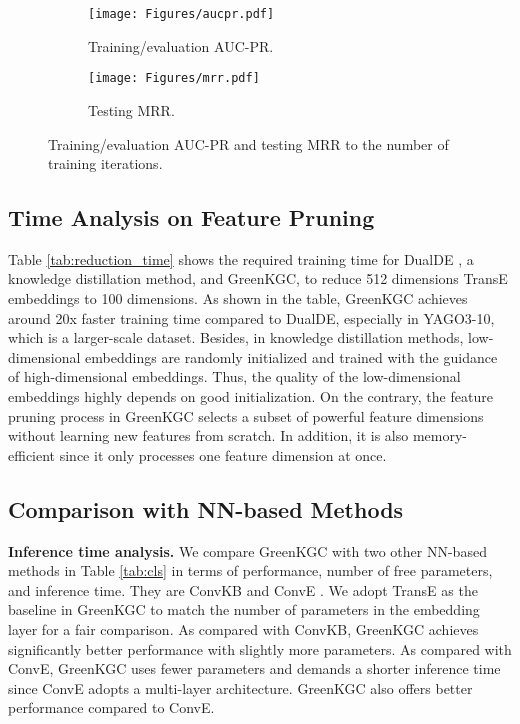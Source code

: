 \documentclass{article}
\begin{document}
\begin{figure}[t]
\centering
     \begin{subfigure}[b]{0.48\textwidth}
         \centering
         \texttt{[image: Figures/aucpr.pdf]}
         \caption{Training/evaluation AUC-PR.} \label{fig:aucpr}
     \end{subfigure}
\begin{subfigure}[b]{0.48\textwidth}
         \centering
         \texttt{[image: Figures/mrr.pdf]}
         \caption{Testing MRR.} \label{fig:mrr}
     \end{subfigure}
\caption{\color{black} Training/evaluation AUC-PR and testing MRR to the number of training iterations.}
\label{fig:training}
\end{figure}



\subsection{Time Analysis on Feature Pruning} Table 
\ref{tab:reduction_time} shows the required training time for DualDE 
\citep{zhu2022dualde}, a knowledge distillation method, and GreenKGC, to reduce 
512 dimensions TransE embeddings to 100 dimensions. As shown in the table, GreenKGC 
achieves around 20x faster training time compared to DualDE, 
especially in YAGO3-10, which is a larger-scale dataset. Besides, in knowledge 
distillation methods, low-dimensional embeddings are randomly initialized and 
trained with the guidance of high-dimensional embeddings. Thus, the quality of 
the low-dimensional embeddings highly depends on good initialization. On the 
contrary, the feature pruning process in GreenKGC selects a subset of powerful 
feature dimensions without learning new features from scratch. In addition, it 
is also memory-efficient since it only processes one feature dimension at 
once.

\subsection{Comparison with NN-based Methods}

\textbf{Inference time analysis.} We compare GreenKGC with two other 
NN-based methods in Table \ref{tab:cls} in terms of performance, 
number of free parameters, and inference time. They are ConvKB \citep{nguyen2018novel}
and ConvE \citep{dettmers2018convolutional}. We adopt TransE as the baseline in GreenKGC
to match the number of parameters in the embedding layer for a fair comparison.
As compared with ConvKB, GreenKGC achieves significantly better performance
with slightly more parameters. As compared with ConvE, GreenKGC uses fewer 
parameters and demands a shorter inference time since ConvE adopts a multi-layer 
architecture. GreenKGC also offers better performance compared to ConvE.
\end{document}
